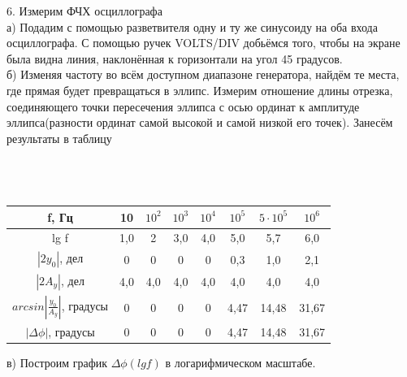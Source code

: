 \documentclass[a4paper, 12pt]{article}
\begin{document}
		6. Измерим ФЧХ осциллографа \\
			а) Подадим с помощью разветвителя одну и ту же синусоиду на оба входа осциллографа. С помощью ручек VOLTS/DIV добьёмся того, чтобы на экране была видна линия, наклонённая к горизонтали на угол 45 градусов. \\
			б) Изменяя частоту во всём доступном диапазоне генератора, найдём те места, где прямая будет превращаться в эллипс. Измерим отношение длины отрезка, соединяющего точки пересечения эллипса с осью ординат к амплитуде эллипса(разности ординат самой высокой и самой низкой его точек). Занесём результаты в таблицу \\
			\\
			\\
			\\
			\begin{longtable}{|c|c|c|c|c|c|c|c|}
				\hline
				f, Гц & 10 & $10^2$ & $10^3$ & $10^4$ & $10^5$ & $5 \cdot 10^5$ & $10^6$ \\
				\hline
				lg f & 1,0 & 2 & 3,0 & 4,0 & 5,0 & 5,7 & 6,0 \\
				$|2y_0|$, дел  & 0 & 0 & 0 & 0 & 0,3 & 1,0 & 2,1 \\
				$|2A_y|$, дел & 4,0 & 4,0 & 4,0 & 4,0 & 4,0 & 4,0 & 4,0 \\
				$arcsin|\frac{y_0}{A_y}|$, градусы & 0 & 0 & 0 & 0 & 4,47 & 14,48 & 31,67 \\
				$|\Delta \phi|$, градусы & 0 & 0 & 0 & 0 & 4,47 & 14,48 & 31,67 \\
				\hline
			\end{longtable}
			в) Построим график $\Delta \phi(lg f)$ в логарифмическом масштабе.
			\begin{figure}[h]
			\end{figure}
		
\end{document}
